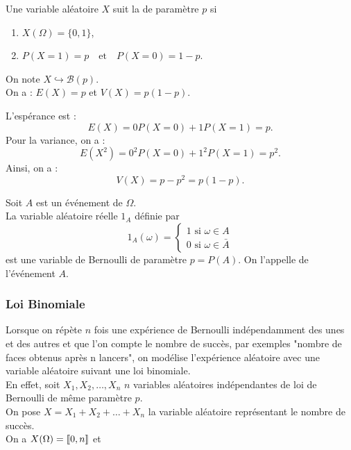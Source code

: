 \documentclass{book}
\begin{document}
\begin{DefinitionProposition}
Une variable aléatoire $X$ suit la  de paramètre $p$
si 
\begin{enumerate}
\item $X(\Omega)=\{0,1\}$,
\item $P(X=1) = p \quad \text{et} \quad P(X=0) = 1-p.$ 
\end{enumerate} 
On note $X \hookrightarrow  \mathcal{B}(p)$.\\
On a : $E(X)=p$ et $V(X)=p(1-p)$.
\end{DefinitionProposition}
\begin{Demonstration}
L'espérance est :
$$E(X)=0 P(X=0)+1P(X=1)=p.$$
Pour la variance, on a :
$$E(X^2)=0^2P(X=0)+1^2P(X=1)=p^2.$$
Ainsi, on a :
$$V(X)=p-p^2=p(1-p).$$
\end{Demonstration}

\begin{DefinitionProposition}
Soit $A$ est un événement de $\Omega$.\\
 La variable aléatoire réelle $1_A$ définie par  
$$1_A(\omega) =\begin{cases}1\text{ si }\omega \in A\\0\text{ si }\omega \in \bar A \end{cases}$$
est une variable de Bernoulli de paramètre $p=P(A)$. On l'appelle  de l'événement $A$.
\end{DefinitionProposition}

\subsubsection{Loi Binomiale}
Lorsque on répète $n$ fois une expérience de Bernoulli indépendamment  des unes et des
autres et que l'on compte le nombre de succès, par exemples "nombre de faces obtenus après n lancers", on modélise l'expérience aléatoire avec une variable aléatoire suivant une loi binomiale.\\
En effet, soit $X_1, X_2,\dots, X_n$ $n$ variables aléatoires indépendantes de loi de Bernoulli de même paramètre $p$.\\
On pose $X=X_1+ X_2+\dots+ X_n$ la variable aléatoire représentant le nombre de succès.\\
On a $X(\Omega) = \mathopen\lbrack\!\lbrack0,n \mathclose\rbrack\!\rbrack$ et
\end{document}
